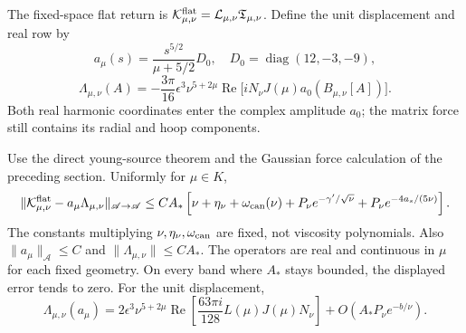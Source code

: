 The fixed-space flat return is
$\mathcal K^{\rm flat}_{\mu,\nu}
  =\mathcal L_{\mu,\nu}\mathfrak T_{\mu,\nu}$.
Define the unit displacement and real row by
\[
 a_\mu(s)=\frac{s^{5/2}}{\mu+5/2}D_0,
 \quad D_0=\operatorname{diag}(12,-3,-9),
\]
\[
 \Lambda_{\mu,\nu}(A)
 =-\frac{3\pi}{16}\epsilon^3\nu^{5+2\mu}
      \operatorname{Re}\bigl[iN_\nu J(\mu)
                       a_0(B_{\mu,\nu}[A])\bigr].
\]
Both real harmonic coordinates enter the complex amplitude $a_0$;
the matrix force still contains its radial and hoop components.

\begin{proposition}\label{source-class:flat-limit}
Use the direct young-source theorem and the Gaussian force calculation
of the preceding section.
Uniformly for $\mu\in K$,
\[
 \|\mathcal K^{\rm flat}_{\mu,\nu}
                 -a_\mu\Lambda_{\mu,\nu}\|_{\mathscr A\to\mathscr A}
 \le C A_*\left[\nu+\eta_\nu+\omega_{\rm can}(\nu)
      +P_\nu e^{-\gamma'/\sqrt\nu}
      +P_\nu e^{-4a_s/(5\nu)}\right].
\]
The constants multiplying $\nu,\eta_\nu,\omega_{\rm can}$ are fixed,
not viscosity polynomials. Also
$\|a_\mu\|_{\mathscr A}\le C$ and
$\|\Lambda_{\mu,\nu}\|\le C A_*$.
The operators are real and continuous in $\mu$ for each fixed geometry.
On every band where $A_*$ stays bounded, the displayed error tends to zero.
For the unit displacement,
\[
 \Lambda_{\mu,\nu}(a_\mu)
 =2\epsilon^3\nu^{5+2\mu}
       \operatorname{Re}\left[\frac{63\pi i}{128}
                               L(\mu)J(\mu)N_\nu\right]
       +O(A_*P_\nu e^{-b/\nu}).
\]
\end{proposition}
